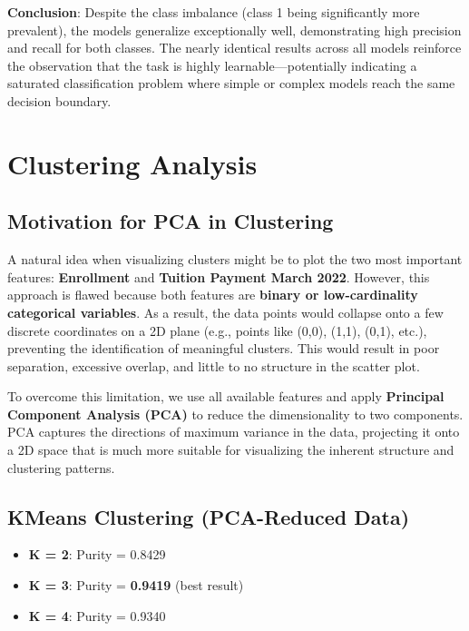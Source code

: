 \documentclass{article}
\begin{document}
\textbf{Conclusion}:  
Despite the class imbalance (class 1 being significantly more prevalent), the models generalize exceptionally well, demonstrating high precision and recall for both classes. The nearly identical results across all models reinforce the observation that the task is highly learnable—potentially indicating a saturated classification problem where simple or complex models reach the same decision boundary.

\newpage
\section{Clustering Analysis}

\subsection*{Motivation for PCA in Clustering}

A natural idea when visualizing clusters might be to plot the two most important features: \textbf{Enrollment} and \textbf{Tuition Payment March 2022}. However, this approach is flawed because both features are \textbf{binary or low-cardinality categorical variables}. As a result, the data points would collapse onto a few discrete coordinates on a 2D plane (e.g., points like (0,0), (1,1), (0,1), etc.), preventing the identification of meaningful clusters. This would result in poor separation, excessive overlap, and little to no structure in the scatter plot.

To overcome this limitation, we use all available features and apply \textbf{Principal Component Analysis (PCA)} to reduce the dimensionality to two components. PCA captures the directions of maximum variance in the data, projecting it onto a 2D space that is much more suitable for visualizing the inherent structure and clustering patterns.

\subsection*{KMeans Clustering (PCA-Reduced Data)}
\begin{itemize}
    \item \textbf{K = 2}: Purity = 0.8429
    \item \textbf{K = 3}: Purity = \textbf{0.9419} (best result)
    \item \textbf{K = 4}: Purity = 0.9340
\end{itemize}
\end{document}
